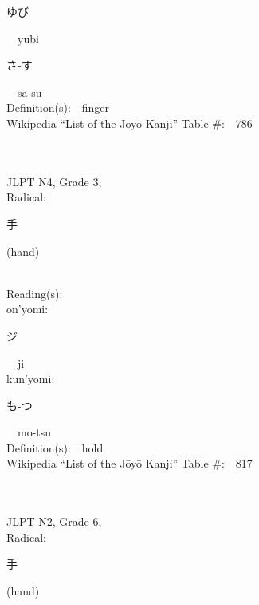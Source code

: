 \begin{multicols}{2}
{\hspace*{2em}}{\begin{CJK}{UTF8}{min} ゆび \end{CJK}}\ \ yubi\ \ \\
{\hspace*{2em}}{\begin{CJK}{UTF8}{min} さ-す \end{CJK}}\ \ sa-su\ \ \\
Definition(s):\ \ finger \\
Wikipedia ``List of the J\=oy\=o Kanji'' Table \#:\ \ 786 \\
\ \ \\
{\fontsize{34pt}{40pt}  }\ \ \\  %
{JLPT N4, Grade 3, \\Radical:\ \ {\begin{CJK}{UTF8}{min} 手 \end{CJK}} (hand) } \\
Reading(s):\ \ \\
{\hspace*{1em}}on'yomi:\ \ \\
{\hspace*{2em}}{\begin{CJK}{UTF8}{min} ジ \end{CJK}}\ \ ji\ \ \\
{\hspace*{1em}}kun'yomi:\ \ \\
{\hspace*{2em}}{\begin{CJK}{UTF8}{min} も-つ \end{CJK}}\ \ mo-tsu\ \ \\
Definition(s):\ \ hold \\
Wikipedia ``List of the J\=oy\=o Kanji'' Table \#:\ \ 817 \\
\ \ \\
{\fontsize{34pt}{40pt}  }\ \ \\  %
{JLPT N2, Grade 6, \\Radical:\ \ {\begin{CJK}{UTF8}{min} 手 \end{CJK}} (hand) } \\

\end{multicols}
